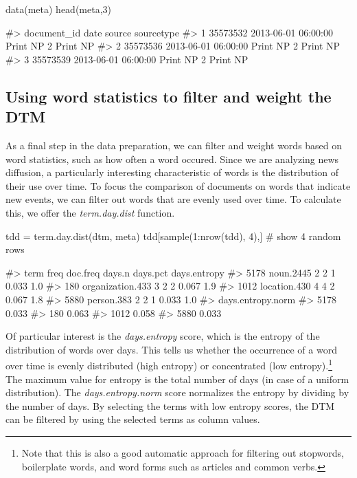 \begin{Schunk}
\begin{Sinput}
data(meta)
head(meta,3)
\end{Sinput}
\begin{Soutput}
#>   document_id                date     source sourcetype
#> 1    35573532 2013-06-01 06:00:00 Print NP 2   Print NP
#> 2    35573536 2013-06-01 06:00:00 Print NP 2   Print NP
#> 3    35573539 2013-06-01 06:00:00 Print NP 2   Print NP
\end{Soutput}
\end{Schunk}

\subsection{Using word statistics to filter and weight the DTM}

As a final step in the data preparation, we can filter and weight words
based on word statistics, such as how often a word occured. Since we are
analyzing news diffusion, a particularly interesting characteristic of
words is the distribution of their use over time. To focus the
comparison of documents on words that indicate new events, we can filter
out words that are evenly used over time. To calculate this, we offer
the \emph{term.day.dist} function.

\begin{Schunk}
\begin{Sinput}
tdd = term.day.dist(dtm, meta)
tdd[sample(1:nrow(tdd), 4),] # show 4 random rows
\end{Sinput}
\begin{Soutput}
#>                  term freq doc.freq days.n days.pct days.entropy
#> 5178        noun.2445    2        2      1    0.033          1.0
#> 180  organization.433    3        2      2    0.067          1.9
#> 1012     location.430    4        4      2    0.067          1.8
#> 5880       person.383    2        2      1    0.033          1.0
#>      days.entropy.norm
#> 5178             0.033
#> 180              0.063
#> 1012             0.058
#> 5880             0.033
\end{Soutput}
\end{Schunk}

Of particular interest is the \emph{days.entropy} score, which is the
entropy of the distribution of words over days. This tells us whether
the occurrence of a word over time is evenly distributed (high entropy)
or concentrated (low entropy).\footnote{Note that this is also a good
  automatic approach for filtering out stopwords, boilerplate words, and
  word forms such as articles and common verbs.} The maximum value for
entropy is the total number of days (in case of a uniform distribution).
The \emph{days.entropy.norm} score normalizes the entropy by dividing by
the number of days. By selecting the terms with low entropy scores, the
DTM can be filtered by using the selected terms as column values.

